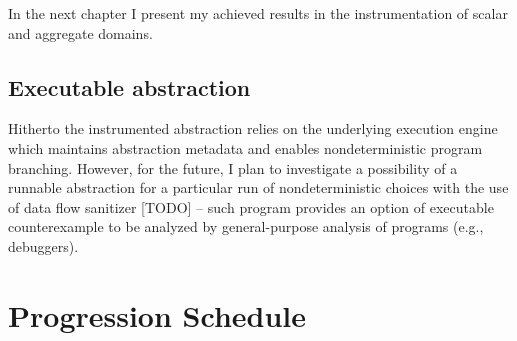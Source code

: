 In the next chapter I present my achieved results in the instrumentation of scalar and aggregate domains.



\subsection{ Executable abstraction }

Hitherto the instrumented abstraction relies on the underlying execution engine
which maintains abstraction metadata and enables nondeterministic program
branching. However, for the future, I plan to investigate a possibility of a
runnable abstraction for a particular run of nondeterministic choices with the
use of data flow sanitizer [TODO] -- such program provides an option of
executable counterexample to be analyzed by general-purpose analysis of \llvm
programs (e.g., debuggers).

\section{Progression Schedule}







